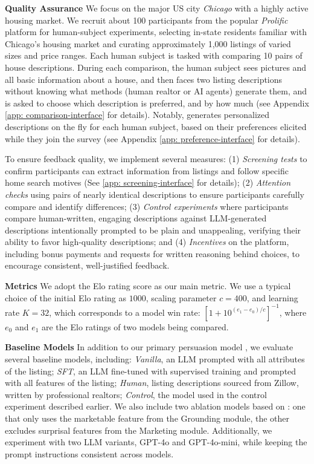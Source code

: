 \textbf{Quality Assurance}\quad
We focus on the major US city \emph{Chicago} with a highly active housing market. We recruit about 100 participants from the popular \emph{Prolific} platform for human-subject experiments, selecting in-state residents familiar with Chicago's housing market and curating approximately 1,000 listings of varied sizes and price ranges.  Each human subject is tasked with comparing 10 pairs of house descriptions. During each comparison, the human subject sees pictures and all basic information about a house, and then faces two listing descriptions without knowing what methods (human realtor or AI agents) generate them, and is asked to choose which description is preferred, and by how much (see Appendix \ref{app: comparison-interface} for details). Notably, \agentname generates personalized descriptions on the fly for each human subject, based on their preferences elicited while they join the survey (see Appendix \ref{app: preference-interface} for details).  

To ensure feedback quality, we implement several measures: (1) \textit{Screening tests} to confirm participants can extract information from listings and follow specific home search motives (See \cref{app: screening-interface} for details); (2) \textit{Attention checks} using pairs of nearly identical descriptions to ensure participants carefully compare and identify differences; (3) \textit{Control experiments} where participants compare human-written, engaging descriptions against LLM-generated descriptions intentionally prompted to be plain and unappealing, verifying their ability to favor high-quality descriptions; and (4) \textit{Incentives} on the platform, including bonus payments and requests for written reasoning behind choices, to encourage consistent, well-justified feedback.

\textbf{Metrics}\quad  
We adopt the Elo rating score
as our main metric. We use a typical choice of the initial Elo rating as $1000$, scaling parameter $c = 400$, and learning rate $K = 32$, which corresponds to a model win rate:  
$\left[{1 + 10^{(e_1 - e_0)/c}}\right]^{-1}$,  
where $e_0$ and $e_1$ are the Elo ratings of two models being compared.  

\textbf{Baseline Models}\quad  
In addition to our primary persuasion model \agentname, we evaluate several baseline models, including:  
\textit{Vanilla}, an LLM prompted with all attributes of the listing;  
\textit{SFT}, an LLM fine-tuned with supervised training and prompted with all features of the listing;  
\textit{Human}, listing descriptions sourced from Zillow, written by professional realtors;  
\textit{Control}, the model used in the control experiment described earlier.  We also include two ablation models based on \agentname: one that only uses the marketable feature from the Grounding module, the other excludes surprisal features from the Marketing module.
Additionally, we experiment with two LLM variants, GPT-4o and GPT-4o-mini, while keeping the prompt instructions consistent across models.  

